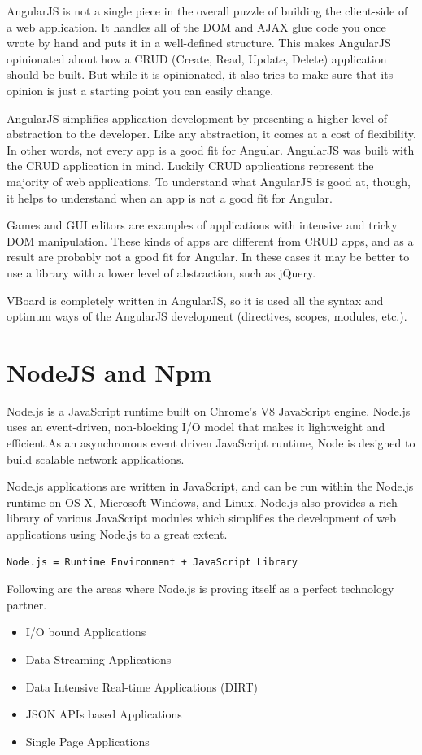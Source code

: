 \documentclass[a4paper, 12pt]{book}
\begin{document}
AngularJS is not a single piece in the overall puzzle of building the client-side of a web application. It handles all of the DOM and AJAX glue code you once wrote by hand and puts it in a well-defined structure. This makes AngularJS opinionated about how a CRUD (Create, Read, Update, Delete) application should be built. But while it is opinionated, it also tries to make sure that its opinion is just a starting point you can easily change.

AngularJS simplifies application development by presenting a higher level of abstraction to the developer. Like any abstraction, it comes at a cost of flexibility. In other words, not every app is a good fit for Angular. AngularJS was built with the CRUD application in mind. Luckily CRUD applications represent the majority of web applications. To understand what AngularJS is good at, though, it helps to understand when an app is not a good fit for Angular.

Games and GUI editors are examples of applications with intensive and tricky DOM manipulation. These kinds of apps are different from CRUD apps, and as a result are probably not a good fit for Angular. In these cases it may be better to use a library with a lower level of abstraction, such as jQuery.

VBoard is completely written in AngularJS, so it is used all the syntax and optimum ways of the AngularJS development (directives, scopes, modules, etc.).

\section{NodeJS and Npm}
\label{sec:nodejsnpm}
Node.js is a JavaScript runtime built on Chrome's V8 JavaScript engine. Node.js uses an event-driven, non-blocking I/O model that makes it lightweight and efficient.As an asynchronous event driven JavaScript runtime, Node is designed to build scalable network applications.

Node.js applications are written in JavaScript, and can be run within the Node.js runtime on OS X, Microsoft Windows, and Linux. Node.js also provides a rich library of various JavaScript modules which simplifies the development of web applications using Node.js to a great extent.

\begin{lstlisting}[frame=single]
Node.js = Runtime Environment + JavaScript Library
\end{lstlisting}

Following are the areas where Node.js is proving itself as a perfect technology partner.
\begin{itemize}
\item I/O bound Applications
\item Data Streaming Applications
\item Data Intensive Real-time Applications (DIRT)
\item JSON APIs based Applications
\item Single Page Applications
\end{itemize}
\end{document}
